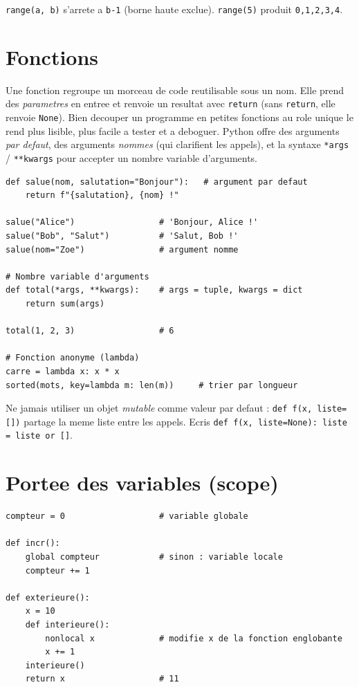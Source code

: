 \documentclass[11pt,a4paper]{article}
\begin{document}
\begin{piege}
\texttt{range(a, b)} s'arrete a \texttt{b-1} (borne haute exclue). \texttt{range(5)}
produit \texttt{0,1,2,3,4}.
\end{piege}

\section{Fonctions}
Une fonction regroupe un morceau de code reutilisable sous un nom. Elle prend des
\emph{parametres} en entree et renvoie un resultat avec \texttt{return} (sans
\texttt{return}, elle renvoie \texttt{None}). Bien decouper un programme en
petites fonctions au role unique le rend plus lisible, plus facile a tester et a
deboguer. Python offre des arguments \emph{par defaut}, des arguments
\emph{nommes} (qui clarifient les appels), et la syntaxe \texttt{*args} /
\texttt{**kwargs} pour accepter un nombre variable d'arguments.

\begin{lstlisting}
def salue(nom, salutation="Bonjour"):   # argument par defaut
    return f"{salutation}, {nom} !"

salue("Alice")                 # 'Bonjour, Alice !'
salue("Bob", "Salut")          # 'Salut, Bob !'
salue(nom="Zoe")               # argument nomme

# Nombre variable d'arguments
def total(*args, **kwargs):    # args = tuple, kwargs = dict
    return sum(args)

total(1, 2, 3)                 # 6

# Fonction anonyme (lambda)
carre = lambda x: x * x
sorted(mots, key=lambda m: len(m))     # trier par longueur
\end{lstlisting}

\begin{piege}
Ne jamais utiliser un objet \emph{mutable} comme valeur par defaut :
\texttt{def f(x, liste=[])} partage la meme liste entre les appels. Ecris
\texttt{def f(x, liste=None): liste = liste or []}.
\end{piege}

\section{Portee des variables (scope)}
\begin{lstlisting}
compteur = 0                   # variable globale

def incr():
    global compteur            # sinon : variable locale
    compteur += 1

def exterieure():
    x = 10
    def interieure():
        nonlocal x             # modifie x de la fonction englobante
        x += 1
    interieure()
    return x                   # 11
\end{lstlisting}
\end{document}
